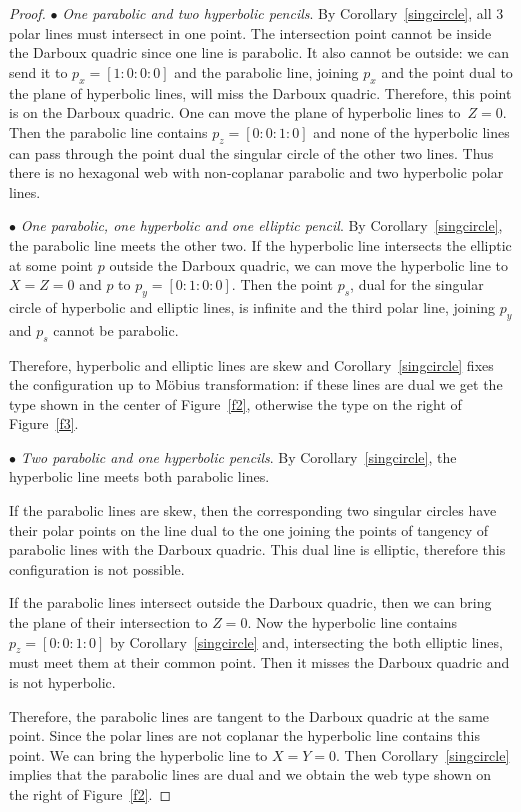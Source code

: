 \documentclass[pdftex]{sigma}
\numberwithin{equation}{section}
\begin{document}
\begin{proof}
$\bullet$ {\it One parabolic and two hyperbolic pencils}.
By Corollary~\ref{singcircle}, all 3 polar lines must intersect in one point. The intersection point cannot be inside the Darboux quadric since one line is parabolic. It also cannot be outside: we can send it to $p_x=[1:0:0:0]$ and the parabolic line, joining $p_x$ and the point dual to the plane of hyperbolic lines, will miss the Darboux quadric. Therefore, this point is on the Darboux quadric. One can move the plane of hyperbolic lines to~${Z=0}$. Then the parabolic line contains $p_z=[0:0:1:0]$ and none of the hyperbolic lines can pass through the point dual the singular circle of the other two lines. Thus there is no hexagonal web with non-coplanar parabolic and two hyperbolic polar lines.

$\bullet$ {\it One parabolic, one hyperbolic and one elliptic pencil}.
By Corollary~\ref{singcircle}, the parabolic line meets the other two.
If the hyperbolic line intersects the elliptic at some point $p$ outside the Darboux quadric, we can move the hyperbolic line to $X=Z=0$ and $p$ to $p_y=[0:1:0:0]$. Then the point $p_s$, dual for the singular circle of hyperbolic and elliptic lines, is infinite and the third polar line, joining $p_y$ and $p_s$ cannot be parabolic.

Therefore, hyperbolic and elliptic lines are skew and Corollary~\ref{singcircle} fixes the configuration up to M\"obius transformation: if these lines are dual we get the type shown in the center of Figure~\ref{f2}, otherwise the type on the right of Figure~\ref{f3}.


$\bullet$ {\it Two parabolic and one hyperbolic pencils}.
By Corollary~\ref{singcircle}, the hyperbolic line meets both parabolic lines.

If the parabolic lines are skew, then the corresponding two singular circles have their polar points on the line dual to the one joining the points of tangency of parabolic lines with the Darboux quadric. This dual line is elliptic, therefore this configuration is not possible.

If the parabolic lines intersect outside the Darboux quadric, then we can bring the plane of their intersection to $Z=0$. Now the hyperbolic line contains $p_z=[0:0:1:0]$ by Corollary~\ref{singcircle} and, intersecting the both elliptic lines, must meet them at their common point. Then it misses the Darboux quadric and is not hyperbolic.

Therefore, the parabolic lines are tangent to the Darboux quadric at the same point. Since the polar lines are not coplanar the hyperbolic line contains this point. We can bring the hyperbolic line to $X=Y=0$. Then Corollary~\ref{singcircle} implies that the parabolic lines are dual and we obtain
the web type shown on the right of Figure~\ref{f2}.


\end{proof}
\end{document}
